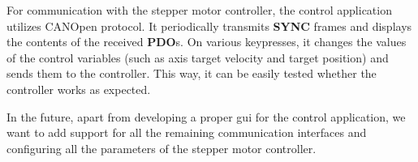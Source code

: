 For communication with the stepper motor controller, the control application utilizes CANOpen protocol.
It periodically transmits \textbf{SYNC} frames and displays the contents of the received \textbf{PDO}s.
On various keypresses, it changes the values of the control variables (such as axis target velocity and target position) and sends them to the controller.
This way, it can be easily tested whether the controller works as expected.

In the future, apart from developing a proper \acs{gui} for the control application, we want to add support for all the remaining communication interfaces and configuring all the parameters of the stepper motor controller.
